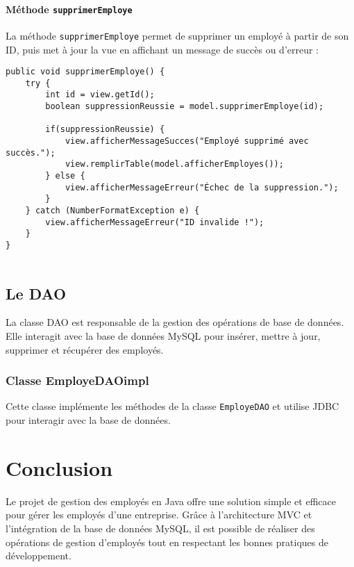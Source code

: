 \documentclass[a4paper,12pt]{report}
\begin{document}
\subsubsection{Méthode \texttt{supprimerEmploye}}
La méthode \texttt{supprimerEmploye} permet de supprimer un employé à partir de son ID, puis met à jour la vue en affichant un message de succès ou d'erreur :
\begin{verbatim}
public void supprimerEmploye() {
    try {
        int id = view.getId();
        boolean suppressionReussie = model.supprimerEmploye(id);

        if(suppressionReussie) {
            view.afficherMessageSucces("Employé supprimé avec succès.");
            view.remplirTable(model.afficherEmployes());
        } else {
            view.afficherMessageErreur("Échec de la suppression.");
        }
    } catch (NumberFormatException e) {
        view.afficherMessageErreur("ID invalide !");
    }
}


\end{verbatim}



\section{Le DAO}
La classe DAO est responsable de la gestion des opérations de base de données. Elle interagit avec la base de données MySQL pour insérer, mettre à jour, supprimer et récupérer des employés.

\subsection{Classe EmployeDAOimpl}
Cette classe implémente les méthodes de la classe \texttt{EmployeDAO} et utilise JDBC pour interagir avec la base de données.

\chapter{Conclusion}
Le projet de gestion des employés en Java offre une solution simple et efficace pour gérer les employés d'une entreprise. Grâce à l'architecture MVC et l'intégration de la base de données MySQL, il est possible de réaliser des opérations de gestion d'employés tout en respectant les bonnes pratiques de développement.
\end{document}
